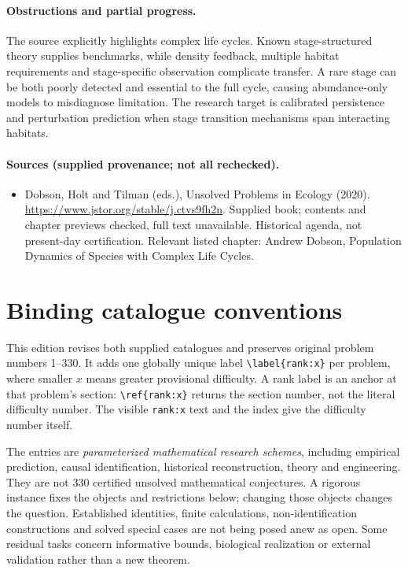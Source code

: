 \documentclass[11pt]{article}
\begin{document}
\paragraph{Obstructions and partial progress.} The source explicitly highlights complex life cycles. Known stage-structured theory supplies benchmarks, while density feedback, multiple habitat requirements and stage-specific observation complicate transfer. A rare stage can be both poorly detected and essential to the full cycle, causing abundance-only models to misdiagnose limitation. The research target is calibrated persistence and perturbation prediction when stage transition mechanisms span interacting habitats.
\paragraph{Sources (supplied provenance; not all rechecked).}
\begin{itemize}
\item Dobson, Holt and Tilman (eds.), Unsolved Problems in Ecology (2020). \url{https://www.jstor.org/stable/j.ctvs9fh2n}. Supplied book; contents and chapter previews checked, full text unavailable. Historical agenda, not present-day certification. Relevant listed chapter: Andrew Dobson, Population Dynamics of Species with Complex Life Cycles.
\end{itemize}


\section*{Binding catalogue conventions}
This edition revises both supplied catalogues and preserves original problem numbers 1--330. It adds one globally unique label \verb|\label{rank:x}| per problem, where smaller $x$ means greater provisional difficulty. A rank label is an anchor at that problem's section: \verb|\ref{rank:x}| returns the section number, not the literal difficulty number. The visible \texttt{rank:x} text and the index give the difficulty number itself.

The entries are \emph{parameterized mathematical research schemes}, including empirical prediction, causal identification, historical reconstruction, theory and engineering. They are not 330 certified unsolved mathematical conjectures. A rigorous instance fixes the objects and restrictions below; changing those objects changes the question. Established identities, finite calculations, non-identification constructions and solved special cases are not being posed anew as open. Some residual tasks concern informative bounds, biological realization or external validation rather than a new theorem.
\end{document}
